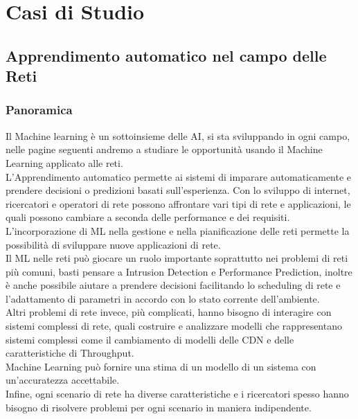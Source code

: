 \documentclass[../tesi.tex]{subfiles}
\begin{document}
\chapter{Casi di Studio}
\section{Apprendimento automatico nel campo delle Reti}



\subsection{Panoramica}
Il Machine learning è un sottoinsieme delle AI, si sta sviluppando in ogni campo, nelle pagine seguenti andremo a studiare le opportunità usando il Machine Learning applicato alle reti.\\
L'Apprendimento automatico permette ai sistemi di imparare automaticamente e prendere decisioni o predizioni basati sull’esperienza.
Con lo sviluppo di internet, ricercatori e operatori di rete possono affrontare vari tipi di rete e applicazioni, le quali possono cambiare a seconda delle performance e dei requisiti.\\
L’incorporazione di ML nella gestione e nella pianificazione delle reti permette la possibilità di sviluppare nuove applicazioni di rete.\\
Il ML nelle reti può giocare un ruolo importante soprattutto nei problemi di reti più comuni, basti pensare a Intrusion Detection e Performance Prediction, inoltre è anche possibile aiutare a prendere decisioni facilitando lo scheduling di rete e l’adattamento di parametri in accordo con lo stato corrente dell’ambiente.\\
Altri problemi di rete invece, più complicati, hanno bisogno di interagire con sistemi complessi di rete, quali costruire e analizzare modelli che rappresentano sistemi complessi come il cambiamento di modelli delle \Gls{CDN} e delle caratteristiche di \Gls{Throughput}.\\
Machine Learning può fornire una stima di un modello di un sistema con un’accuratezza accettabile.\\
Infine, ogni scenario di rete ha diverse caratteristiche e i ricercatori spesso hanno bisogno di risolvere problemi per ogni scenario in maniera indipendente.
\end{document}
